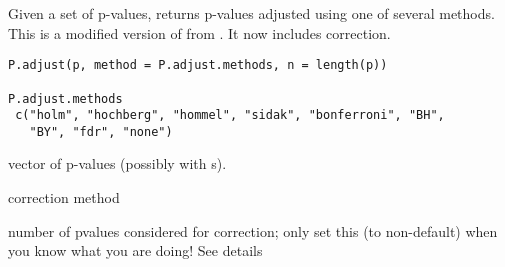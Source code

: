 \documentclass[a4paper]{book}
\begin{document}
\newpage
{}
%
\begin{Description}\relax
Given a set of p-values, returns p-values adjusted using
one of several methods.  This is a modified version of  from .
It now includes  correction.
\end{Description}
%
\begin{Usage}
\begin{verbatim}
P.adjust(p, method = P.adjust.methods, n = length(p))

P.adjust.methods
 c("holm", "hochberg", "hommel", "sidak", "bonferroni", "BH",
   "BY", "fdr", "none")
\end{verbatim}
\end{Usage}
%
\begin{Arguments}
\begin{ldescription}
\item[\code{p}] vector of p-values (possibly with s).
\item[\code{method}] correction method
\item[\code{n}] number of pvalues considered for correction;
only set this (to non-default) when you know what you are doing! See details
\end{ldescription}
\end{Arguments}
%
\end{document}
